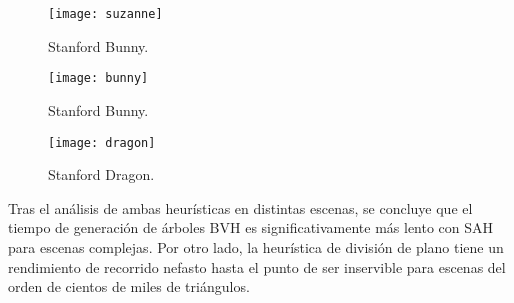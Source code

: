 \begin{figure}[H]
	\centering
	\begin{minipage}[b]{0.3\textwidth}
    \texttt{[image: suzanne]}
    \caption{Stanford Bunny.}
  \end{minipage}
    \hfill
  \begin{minipage}[b]{0.3\textwidth}
    \texttt{[image: bunny]}
    \caption{Stanford Bunny.}
  \end{minipage}
  \hfill
  \begin{minipage}[b]{0.3\textwidth}
    \texttt{[image: dragon]}
    \caption{Stanford Dragon.}
  \end{minipage}
\end{figure}

Tras el análisis de ambas heurísticas en distintas escenas, se concluye que el tiempo de generación de árboles BVH es significativamente más lento con SAH para escenas complejas. Por otro lado, la heurística de división de plano tiene un rendimiento de recorrido nefasto hasta el punto de ser inservible para escenas del orden de cientos de miles de triángulos.
	
